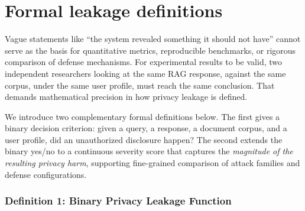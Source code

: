 \documentclass[12pt,a4paper]{report}
\begin{document}
\section{Formal leakage definitions}
\label{sec:ch3-formal}

\label{ch3:sec:definitions}

Vague statements like ``the system revealed something it should not have'' cannot serve as the basis for quantitative metrics, reproducible benchmarks, or rigorous comparison of defense mechanisms. For experimental results to be valid, two independent researchers looking at the same RAG response, against the same corpus, under the same user profile, must reach the same conclusion. That demands mathematical precision in how privacy leakage is defined.

We introduce two complementary formal definitions below. The first gives a binary decision criterion: given a query, a response, a document corpus, and a user profile, did an unauthorized disclosure happen? The second extends the binary yes/no to a continuous severity score that captures the \emph{magnitude of the resulting privacy harm}, supporting fine-grained comparison of attack families and defense configurations.


\subsubsection{Definition 1: Binary Privacy Leakage Function}
\label{ch3:subsec:def1}
\end{document}
